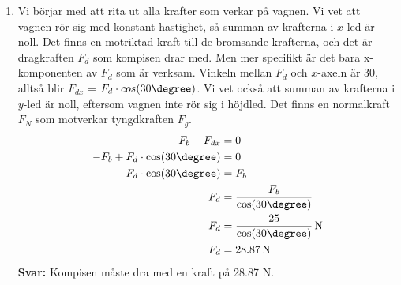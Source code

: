 \documentclass[11pt]{article}
\begin{document}
\begin{enumerate}[itemsep=2em]
              \newpage
        \item
              \raggedright
              Vi börjar med att rita ut alla krafter som verkar på vagnen. Vi vet att vagnen rör sig med konstant hastighet, så summan av krafterna i $x$-led är noll. Det finns en motriktad kraft till de bromsande krafterna, och det är dragkraften $F_d$ som kompisen drar med. Men mer specifikt är det bara x-komponenten av $F_d$ som är verksam. Vinkeln mellan $F_d$ och $x$-axeln är 30\degree{}, alltså blir $F_{dx}$ = $F_d \cdot cos(30\degree)$. Vi vet också att summan av krafterna i $y$-led är noll, eftersom vagnen inte rör sig i höjdled. Det finns en normalkraft $F_{N}$ som motverkar tyngdkraften $F_g$.
              \begin{align*}
                      -F_b + F_{dx}                    & = 0                                      \\
                      -F_b + F_d \cdot \cos(30\degree) & = 0                                      \\
                      F_d \cdot \cos(30\degree)        & = F_b                                    \\
                      F_d                              & = \frac{F_b}{\cos(30\degree)}            \\
                      F_d                              & = \frac{25}{\cos(30\degree)}\,\mathrm{N} \\
                      F_d                              & = 28.87\,\mathrm{N}
              \end{align*}
              \textbf{Svar:} Kompisen måste dra med en kraft på 28.87 N.
\end{enumerate}
\end{document}
